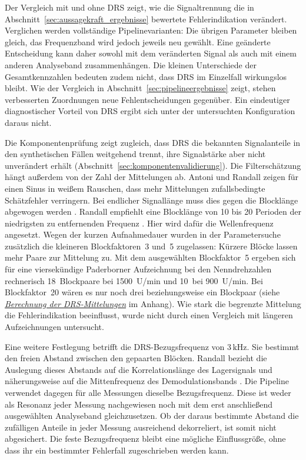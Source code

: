 Der Vergleich mit und ohne DRS zeigt, wie die Signaltrennung die in
Abschnitt~\ref{sec:aussagekraft_ergebnisse} bewertete Fehlerindikation
verändert. Verglichen werden vollständige Pipelinevarianten: Die übrigen
Parameter bleiben gleich, das Frequenzband wird jedoch jeweils neu gewählt.
Eine geänderte Entscheidung kann daher sowohl mit dem veränderten Signal
als auch mit einem anderen Analyseband zusammenhängen. Die kleinen
Unterschiede der Gesamtkennzahlen bedeuten zudem nicht, dass DRS im Einzelfall
wirkungslos bleibt. Wie der Vergleich in Abschnitt~\ref{sec:pipelineergebnisse}
zeigt, stehen verbesserten Zuordnungen neue Fehlentscheidungen gegenüber.
Ein eindeutiger diagnostischer Vorteil von DRS ergibt sich unter der
untersuchten Konfiguration daraus nicht.

Die Komponentenprüfung zeigt zugleich, dass DRS die bekannten Signalanteile
in den synthetischen Fällen weitgehend trennt, ihre Signalstärke aber nicht
unverändert erhält (Abschnitt~\ref{sec:komponentenvalidierung}). Die
Filterschätzung hängt außerdem von der Zahl der Mittelungen ab. Antoni und
Randall zeigen für einen Sinus in weißem Rauschen, dass mehr Mittelungen
zufallsbedingte Schätzfehler verringern. Bei endlicher Signallänge muss dies
gegen die Blocklänge abgewogen werden \cite[S.~112--113, Abschn.~3.5]
{antoniUnsupervisedNoiseCancellation2004}.
Randall empfiehlt eine Blocklänge von 10 bis 20 Perioden der niedrigsten
zu entfernenden Frequenz \cite[S.~277, Abschn.~7.3.2]
{randallVibrationbasedConditionMonitoring2022}. Hier wird dafür die
Wellenfrequenz angesetzt. Wegen der kurzen Aufnahmedauer wurden in der
Parametersuche zusätzlich die kleineren Blockfaktoren~3 und~5 zugelassen:
Kürzere Blöcke lassen mehr Paare zur Mittelung zu.
Mit dem ausgewählten Blockfaktor~5 ergeben sich für eine viersekündige
Paderborner Aufzeichnung bei den Nenndrehzahlen rechnerisch 18~Blockpaare
bei 1500~U/min und 10~bei 900~U/min. Bei Blockfaktor~20 wären es nur
noch drei beziehungsweise ein Blockpaar
(siehe \hyperref[app:drs_mittelungen]{\emph{Berechnung der DRS-Mittelungen}}
im Anhang).
Wie stark die begrenzte Mittelung die Fehlerindikation beeinflusst, wurde
nicht durch einen Vergleich mit längeren Aufzeichnungen untersucht.

Eine weitere Festlegung betrifft die DRS-Bezugsfrequenz von
$3\,\mathrm{kHz}$. Sie bestimmt den freien Abstand zwischen den gepaarten
Blöcken. Randall bezieht die Auslegung dieses Abstands auf die
Korrelationslänge des Lagersignals und näherungsweise auf die Mittenfrequenz
des Demodulationsbands \cite[S.~277, Abschn.~7.3.2]
{randallVibrationbasedConditionMonitoring2022}.
Die Pipeline verwendet dagegen für alle Messungen dieselbe Bezugsfrequenz.
Diese ist weder als Resonanz jeder Messung nachgewiesen noch mit dem erst
anschließend ausgewählten Analyseband gleichzusetzen. Ob der daraus
bestimmte Abstand die zufälligen Anteile in jeder Messung ausreichend
dekorreliert, ist somit nicht abgesichert. Die feste Bezugsfrequenz bleibt
eine mögliche Einflussgröße, ohne dass ihr ein bestimmter Fehlerfall
zugeschrieben werden kann.

